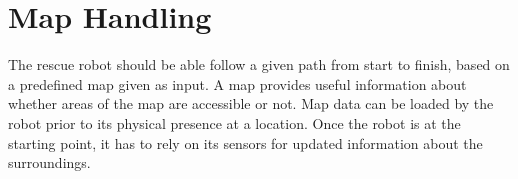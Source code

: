 
% 












\chapter{Map Handling}
\label{ch:map_handling} %
The rescue robot should be able follow a given path from start to finish, based on a predefined map given as input.
A map provides useful information about whether areas of the map are accessible or not. Map data can be loaded by the robot prior to its physical presence at a location. Once the robot is at the starting point, it has to rely on its sensors for updated information about the surroundings. 

